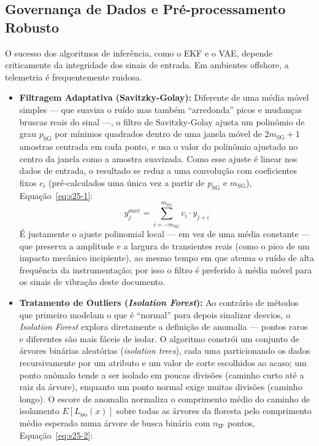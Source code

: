 \documentclass[12pt,a4paper]{article}
\numberwithin{equation}{section}
\numberwithin{table}{section}
\numberwithin{figure}{section}
\begin{document}
{	\subsection{Governança de Dados e Pré-processamento Robusto}
	O sucesso dos algoritmos de inferência, como o EKF e o VAE, depende criticamente da integridade dos sinais de entrada. Em ambientes offshore, a telemetria é frequentemente ruidosa.
	\begin{itemize}
		\item \textbf{Filtragem Adaptativa (Savitzky-Golay):} Diferente de uma média móvel simples — que suaviza o ruído mas também ``arredonda'' picos e mudanças bruscas reais do sinal —, o filtro de Savitzky-Golay \cite{savgol} ajusta um polinômio de grau $p_{\text{SG}}$ por mínimos quadrados dentro de uma janela móvel de $2m_{\text{SG}}+1$ amostras centrada em cada ponto, e usa o valor do polinômio ajustado no centro da janela como a amostra suavizada. Como esse ajuste é linear nos dados de entrada, o resultado se reduz a uma convolução com coeficientes fixos $c_i$ (pré-calculados uma única vez a partir de $p_{\text{SG}}$ e $m_{\text{SG}}$), Equação~\eqref{eq:s25-1}:
		\begin{equation}\label{eq:s25-1}
 y_j^{\text{suav}} = \sum_{i=-m_{\text{SG}}}^{m_{\text{SG}}} c_i \cdotp y_{j+i}
\end{equation}
		É justamente o ajuste polinomial local — em vez de uma média constante — que preserva a amplitude e a largura de transientes reais (como o pico de um impacto mecânico incipiente), ao mesmo tempo em que atenua o ruído de alta frequência da instrumentação; por isso o filtro é preferido à média móvel para os sinais de vibração deste documento.
		\item \textbf{Tratamento de Outliers (\textit{Isolation Forest}):} Ao contrário de métodos que primeiro modelam o que é ``normal'' para depois sinalizar desvios, o \textit{Isolation Forest} \cite{isoforest} explora diretamente a definição de anomalia — pontos raros e diferentes são mais fáceis de isolar. O algoritmo constrói um conjunto de árvores binárias aleatórias (\textit{isolation trees}), cada uma particionando os dados recursivamente por um atributo e um valor de corte escolhidos ao acaso; um ponto anômalo tende a ser isolado em poucas divisões (caminho curto até a raiz da árvore), enquanto um ponto normal exige muitas divisões (caminho longo). O escore de anomalia normaliza o comprimento médio do caminho de isolamento $E[L_{\text{iso}}(x)]$ sobre todas as árvores da floresta pelo comprimento médio esperado numa árvore de busca binária com $n_{\text{IF}}$ pontos, Equação~\eqref{eq:s25-2}:

\end{itemize}}
\end{document}
